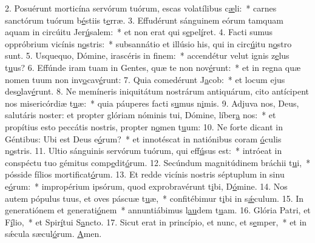 2. Posuérunt morticína servórum tuórum, escas volatílibus c\uline{æ}li:~* carnes sanctórum tuórum b\uline{é}stiis t\uline{e}rræ.
3. Effudérunt sánguinem eórum tamquam aquam in circúitu Jer\uline{ú}salem:~* et non erat qui s\uline{e}pel\uline{í}ret.
4. Facti sumus oppróbrium vicínis n\uline{o}stris:~* subsannátio et illúsio his, qui in circ\uline{ú}itu n\uline{o}stro sunt.
5. Usquequo, Dómine, irascéris in f\uline{i}nem:~* accendétur velut ignis z\uline{e}lus t\uline{u}us?
6. Effúnde iram tuam in Gentes, quæ te non nov\uline{é}runt:~* et in regna quæ nomen tuum non inv\uline{o}cav\uline{é}runt:
7. Quia comedérunt J\uline{a}cob:~* et locum ejus des\uline{o}lav\uline{é}runt.
8. Ne memíneris iniquitátum nostrárum antiquárum, cito antícipent nos misericórdiæ t\uline{u}æ:~* quia páuperes facti s\uline{u}mus n\uline{i}mis.
9. Adjuva nos, Deus, salutáris noster: et propter glóriam nóminis tui, Dómine, líber\uline{a} nos:~* et propítius esto peccátis nostris, propter n\uline{o}men t\uline{u}um:
10. Ne forte dicant in Géntibus: Ubi est Deus e\uline{ó}rum?~* et innotéscat in natiónibus coram \uline{ó}culis n\uline{o}stris.
11. Ultio sánguinis servórum tuórum, qui eff\uline{ú}sus est:~* intróeat in conspéctu tuo gémitus comp\uline{e}dit\uline{ó}rum.
12. Secúndum magnitúdinem bráchii t\uline{u}i,~* pósside fílios mortif\uline{i}cat\uline{ó}rum.
13. Et redde vicínis nostris séptuplum in sinu e\uline{ó}rum:~* impropérium ipsórum, quod exprobravérunt t\uline{i}bi, D\uline{ó}mine.
14. Nos autem pópulus tuus, et oves páscuæ t\uline{u}æ,~* confitébimur t\uline{i}bi in s\uline{ǽ}culum.
15. In generatiónem et generati\uline{ó}nem~* annuntiábimus l\uline{au}dem t\uline{u}am.
16. Glória Patri, et F\uline{í}lio,~* et Spir\uline{í}tui S\uline{a}ncto.
17. Sicut erat in princípio, et nunc, et s\uline{e}mper,~* et in sǽcula sæcul\uline{ó}rum. \uline{A}men.
